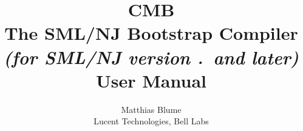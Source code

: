 \documentclass[titlepage,letterpaper]{article}
\author{Matthias Blume \\
Lucent Technologies, Bell Labs}
\title{{\bf CMB}\\
The SML/NJ Bootstrap Compiler \\
{\it\small (for SML/NJ version \smlmj.\smlmn~and later)} \\
User Manual}
\begin{document}


\maketitle

\pagebreak

\tableofcontents

\pagebreak








\pagebreak


\end{document}
